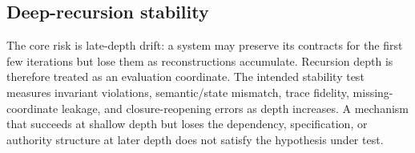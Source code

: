 \subsection{Deep-recursion stability}

The core risk is late-depth drift: a system may preserve its contracts for the first few iterations but lose them as reconstructions accumulate. Recursion depth is therefore treated as an evaluation coordinate. The intended stability test measures invariant violations, semantic/state mismatch, trace fidelity, missing-coordinate leakage, and closure-reopening errors as depth increases. A mechanism that succeeds at shallow depth but loses the dependency, specification, or authority structure at later depth does not satisfy the hypothesis under test.
